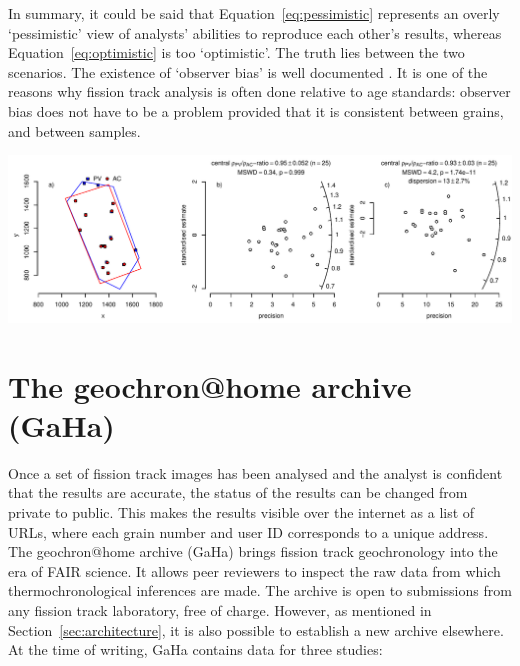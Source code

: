 \documentclass[gchron, manuscript]{copernicus}
\begin{document}
In summary, it could be said that Equation~\ref{eq:pessimistic}
represents an overly `pessimistic' view of analysts' abilities to
reproduce each other's results, whereas Equation~\ref{eq:optimistic}
is too `optimistic'. The truth lies between the two scenarios.  The
existence of `observer bias' is well documented \citep{tamer2025}.  It
is one of the reasons why fission track analysis is often done
relative to age standards: observer bias does not have to be a problem
provided that it is consistent between grains, and between
samples.\medskip

{ \centering \includegraphics[width=\linewidth]{AvP.pdf}
  \label{fig:AvP}
}%

\section{The geochron@home archive (GaHa)}\label{sec:GaHa}

Once a set of fission track images has been analysed and the analyst
is confident that the results are accurate, the status of the results
can be changed from private to public. This makes the results visible
over the internet as a list of URLs, where each grain number and user
ID corresponds to a unique address. The geochron@home archive
(GaHa) brings fission track geochronology into the era of FAIR
science. It allows peer reviewers to inspect the raw data from which
thermochronological inferences are made. The archive is open to
submissions from any fission track laboratory, free of charge.
However, as mentioned in Section~\ref{sec:architecture}, it is also
possible to establish a new archive elsewhere. At the time of writing,
GaHa contains data for three studies:
\end{document}
